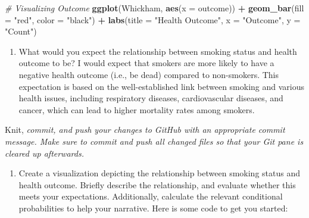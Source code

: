 \documentclass[
]{article}
\newenvironment{Shaded}{\begin{snugshade}}{\end{snugshade}}
\newcommand{\AttributeTok}[1]{\textcolor[rgb]{0.13,0.29,0.53}{#1}}
\newcommand{\CommentTok}[1]{\textcolor[rgb]{0.56,0.35,0.01}{\textit{#1}}}
\newcommand{\FunctionTok}[1]{\textcolor[rgb]{0.13,0.29,0.53}{\textbf{#1}}}
\newcommand{\NormalTok}[1]{#1}
\newcommand{\SpecialCharTok}[1]{\textcolor[rgb]{0.81,0.36,0.00}{\textbf{#1}}}
\newcommand{\StringTok}[1]{\textcolor[rgb]{0.31,0.60,0.02}{#1}}
\providecommand{\tightlist}{%
  \setlength{\itemsep}{0pt}\setlength{\parskip}{0pt}}
\begin{document}
\begin{Shaded}
\begin{Highlighting}[]
\CommentTok{\# Visualizing Outcome}
\FunctionTok{ggplot}\NormalTok{(Whickham, }\FunctionTok{aes}\NormalTok{(}\AttributeTok{x =}\NormalTok{ outcome)) }\SpecialCharTok{+}
  \FunctionTok{geom\_bar}\NormalTok{(}\AttributeTok{fill =} \StringTok{"red"}\NormalTok{, }\AttributeTok{color =} \StringTok{"black"}\NormalTok{) }\SpecialCharTok{+}
  \FunctionTok{labs}\NormalTok{(}\AttributeTok{title =} \StringTok{"Health Outcome"}\NormalTok{, }\AttributeTok{x =} \StringTok{"Outcome"}\NormalTok{, }\AttributeTok{y =} \StringTok{"Count"}\NormalTok{)}
\end{Highlighting}
\end{Shaded}

\begin{enumerate}
\def\labelenumi{\arabic{enumi}.}
\setcounter{enumi}{3}
\tightlist
\item
  What would you expect the relationship between smoking status and
  health outcome to be? I would expect that smokers are more likely to
  have a negative health outcome (i.e., be dead) compared to
  non-smokers. This expectation is based on the well-established link
  between smoking and various health issues, including respiratory
  diseases, cardiovascular diseases, and cancer, which can lead to
  higher mortality rates among smokers.
\end{enumerate}

Knit, \emph{commit, and push your changes to GitHub with an appropriate
commit message. Make sure to commit and push all changed files so that
your Git pane is cleared up afterwards.}

\begin{enumerate}
\def\labelenumi{\arabic{enumi}.}
\setcounter{enumi}{4}
\tightlist
\item
  Create a visualization depicting the relationship between smoking
  status and health outcome. Briefly describe the relationship, and
  evaluate whether this meets your expectations. Additionally, calculate
  the relevant conditional probabilities to help your narrative. Here is
  some code to get you started:
\end{enumerate}
\end{document}
